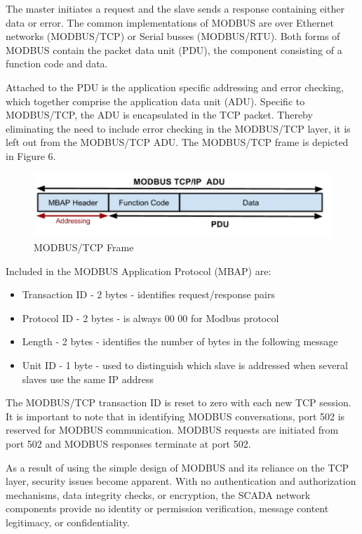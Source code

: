 \documentclass[12pt,]{article}
\begin{document}
The master initiates a request and the slave sends a response containing
either data or error. The common implementations of MODBUS are over
Ethernet networks (MODBUS/TCP) or Serial busses (MODBUS/RTU). Both forms
of MODBUS contain the packet data unit (PDU), the component consisting
of a function code and data.

Attached to the PDU is the application specific addressing and error
checking, which together comprise the application data unit (ADU).
Specific to MODBUS/TCP, the ADU is encapsulated in the TCP packet.
Thereby eliminating the need to include error checking in the MODBUS/TCP
layer, it is left out from the MODBUS/TCP ADU. The MODBUS/TCP frame is
depicted in Figure 6.

\begin{figure}

{\centering \includegraphics{thesis_files/figure-latex/unnamed-chunk-9-1} 

}

\caption{MODBUS/TCP Frame}\label{fig:unnamed-chunk-9}
\end{figure}

Included in the MODBUS Application Protocol (MBAP) are:

\begin{itemize}
\itemsep1pt\parskip0pt
\item
  Transaction ID - 2 bytes - identifies request/response pairs
\item
  Protocol ID - 2 bytes - is always 00 00 for Modbus protocol
\item
  Length - 2 bytes - identifies the number of bytes in the following
  message
\item
  Unit ID - 1 byte - used to distinguish which slave is addressed when
  several slaves use the same IP address
\end{itemize}

The MODBUS/TCP transaction ID is reset to zero with each new TCP
session. It is important to note that in identifying MODBUS
conversations, port 502 is reserved for MODBUS communication. MODBUS
requests are initiated from port 502 and MODBUS responses terminate at
port 502.

As a result of using the simple design of MODBUS and its reliance on the
TCP layer, security issues become apparent. With no authentication and
authorization mechanisms, data integrity checks, or encryption, the
SCADA network components provide no identity or permission verification,
message content legitimacy, or confidentiality.
\end{document}
